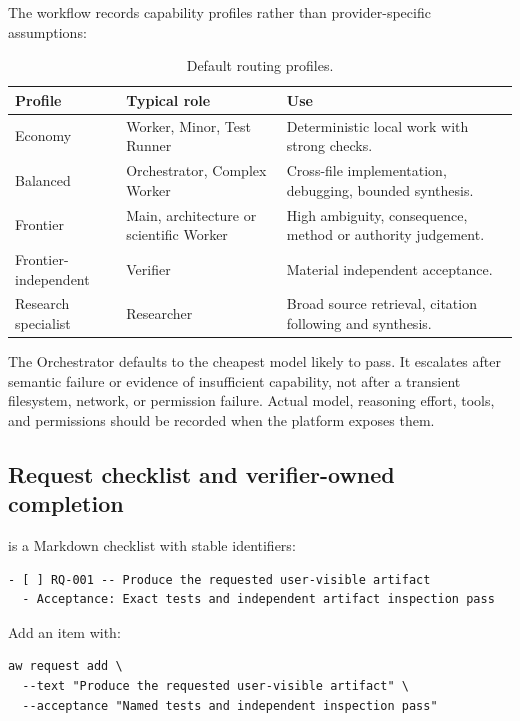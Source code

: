 \documentclass[11pt,a4paper]{article}
\newcommand{\code}[1]{\texttt{\detokenize{#1}}}
\begin{document}
The workflow records capability profiles rather than provider-specific assumptions:

\begin{table}[H]
\centering
\caption{Default routing profiles.}
\begin{tabularx}{\textwidth}{P{0.22\textwidth}P{0.23\textwidth}Y}
\toprule
\textbf{Profile} & \textbf{Typical role} & \textbf{Use} \\
\midrule
Economy & Worker, Minor, Test Runner & Deterministic local work with strong checks. \\
Balanced & Orchestrator, Complex Worker & Cross-file implementation, debugging, bounded synthesis. \\
Frontier & Main, architecture or scientific Worker & High ambiguity, consequence, method or authority judgement. \\
Frontier-independent & Verifier & Material independent acceptance. \\
Research specialist & Researcher & Broad source retrieval, citation following and synthesis. \\
\bottomrule
\end{tabularx}
\end{table}

The Orchestrator defaults to the cheapest model likely to pass. It escalates after semantic failure
or evidence of insufficient capability, not after a transient filesystem, network, or permission
failure. Actual model, reasoning effort, tools, and permissions should be recorded when the platform
exposes them.

\subsection{Request checklist and verifier-owned completion}

\code{REQUESTS.md} is a Markdown checklist with stable identifiers:

\begin{lstlisting}[style=workflow]
- [ ] RQ-001 -- Produce the requested user-visible artifact
  - Acceptance: Exact tests and independent artifact inspection pass
\end{lstlisting}

Add an item with:

\begin{lstlisting}[style=workflow]
aw request add \
  --text "Produce the requested user-visible artifact" \
  --acceptance "Named tests and independent inspection pass"
\end{lstlisting}
\end{document}
